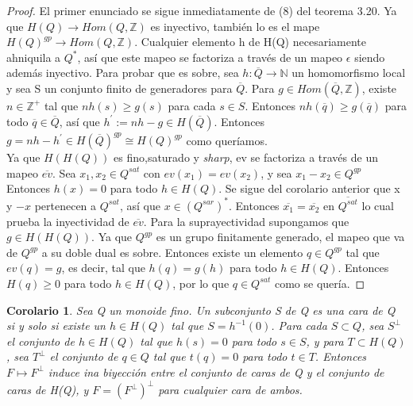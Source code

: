 \documentclass[12pt,spanish]{amsart}
\newcommand{\bb}[1]{\mathbb{#1}}
\newtheorem{cor}[Theorem]{Corolario}
\theoremstyle{definition}
\theoremstyle{remark}
\begin{document}
\begin{proof}
El primer enunciado se sigue inmediatamente de (8) del teorema 3.20. Ya que $H(Q) \to Hom(Q,\bb{Z})$ es inyectivo, también lo es el mape $H(Q)^{gp} \to Hom(Q,\bb{Z})$. Cualquier elemento h de H(Q) necesariamente ahniquila a $Q^{\ast}$, así que este mapeo se factoriza a través de un mapeo $\epsilon$ siendo además inyectivo. Para probar que es sobre, sea $h:\overline{Q} \to \bb{N}$ un homomorfismo local y sea S un conjunto finito de generadores para $\overline{Q}$. Para $g\in Hom(\overline{Q},\bb{Z})$, existe $n\in \bb{Z}^{+}$ tal que $nh(s)\geq g(s)$ para cada $s\in S$. Entonces $nh(\overline{q})\geq g(\overline{q})$ para todo $\overline{q}\in \overline{Q}$, así que $h^{\prime}:=nh-g\in H(\overline{Q})$. Entonces $g=nh-h^{\prime}\in H(\overline{Q})^{gp} \cong H(Q)^{gp}$ como queríamos. \\
Ya que $H(H(Q))$ es fino,saturado y \textit{sharp}, ev se factoriza a través de un mapeo $\overline{ev}$. Sea $x_{1},x_{2}\in Q^{sat}$ con $ev(x_{1})=ev(x_{2})$, y sea $x_{1}-x_{2}\in Q^{gp}$ Entonces $h(x)=0$ para todo $h\in H(Q)$. Se sigue del corolario anterior que x y $-x$ pertenecen a $Q^{sat}$, así que $x\in (Q^{sar})^{\ast}$. Entonces $\overline{x_{1}}=\overline{x_{2}}$ en $\overline{Q^{sat}}$ lo cual prueba la inyectividad de $\overline{ev}$. Para la suprayectividad supongamos que $g\in H(H(Q))$. Ya que $Q^{gp}$ es un grupo finitamente generado, el mapeo que va de $Q^{gp}$ a su doble dual es sobre. Entonces existe un elemento $q\in Q^{gp}$ tal que $ev(q)=g$, es decir, tal que $h(q)=g(h)$ para todo $h\in H(Q)$. Entonces $H(q)\geq 0$ para todo $h\in H(Q)$, por lo que $q\in Q^{sat} $ como se quería.   
\end{proof}


\begin{cor}
Sea Q un monoide fino. Un subconjunto S de Q es una cara de Q si y solo si existe un $h\in H(Q)$ tal que $S=h^{-1}(0)$. Para cada $S \subset Q$, sea $S^{\perp}$ el conjunto de $h\in H(Q)$ tal que $h(s)=0$ para todo $s\in S$, y para $T \subset H(Q)$, sea $T^{\perp}$ el conjunto de $q\in Q$ tal que $t(q)=0$ para todo $t\in T$. Entonces $F \mapsto F^{\perp}$ induce ina biyección entre el conjunto de caras de Q y el conjunto de caras de H(Q), y $F=(F^{\perp})^{\perp}$ para cualquier cara de ambos.  
\end{cor}
\end{document}

